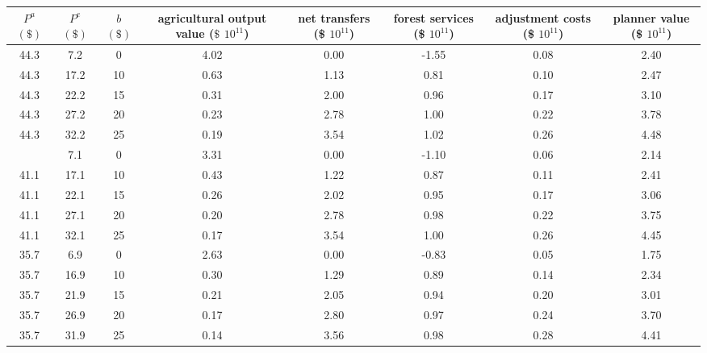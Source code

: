 
\begin{tabular}[t]{cccccccc}
\toprule
\makecell[c]{$P^a$ \\ $(\$)$} & \makecell[c]{$P^e$ \\ $(\$)$} & \makecell[c]{$b$ \\ $(\$)$} & \makecell[c]{agricultural \\ output value \\ ($\$$ $10^{11}$)} & \makecell[c]{net \\ transfers \\ (\$ $10^{11}$)} & \makecell[c]{forest \\ services \\ (\$ $10^{11}$)} & \makecell[c]{adjustment \\ costs \\ (\$ $10^{11}$)} & \makecell[c]{planner \\ value \\ (\$ $10^{11}$)}\\
\midrule

44.3 &  7.2 &  0 &      4.02 &      0.00 &     -1.55 &      0.08 &      2.40 \\
44.3 & 17.2 & 10 &      0.63 &      1.13 &      0.81 &      0.10 &      2.47 \\
44.3 & 22.2 & 15 &      0.31 &      2.00 &      0.96 &      0.17 &      3.10 \\
44.3 & 27.2 & 20 &      0.23 &      2.78 &      1.00 &      0.22 &      3.78 \\
44.3 & 32.2 & 25 &      0.19 &      3.54 &      1.02 &      0.26 &      4.48 \\
\addlinespace
41.1 &  7.1 &  0 &  3.31 &  0.00 & -1.10 &  0.06 &  2.14 \\
41.1 & 17.1 & 10 &  0.43 &  1.22 &  0.87 &  0.11 &  2.41 \\
41.1 & 22.1 & 15 &  0.26 &  2.02 &  0.95 &  0.17 &  3.06 \\
41.1 & 27.1 & 20 &  0.20 &  2.78 &  0.98 &  0.22 &  3.75 \\
41.1 & 32.1 & 25 &  0.17 &  3.54 &  1.00 &  0.26 &  4.45 \\
\addlinespace

35.7 &  6.9 &  0 &      2.63 &      0.00 &     -0.83 &      0.05 &      1.75 \\
35.7 & 16.9 & 10 &      0.30 &      1.29 &      0.89 &      0.14 &      2.34 \\
35.7 & 21.9 & 15 &      0.21 &      2.05 &      0.94 &      0.20 &      3.01 \\
35.7 & 26.9 & 20 &      0.17 &      2.80 &      0.97 &      0.24 &      3.70 \\
35.7 & 31.9 & 25 &      0.14 &      3.56 &      0.98 &      0.28 &      4.41 \\
\bottomrule
\end{tabular}

